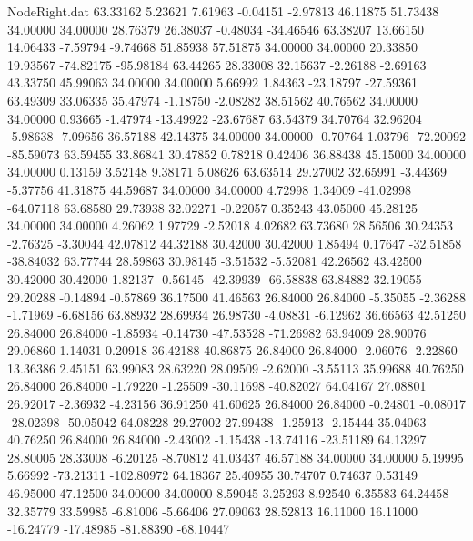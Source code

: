 \begin{filecontents}{NodeRight.dat}
  63.33162    5.23621    7.61963    -0.04151   -2.97813   46.11875   51.73438   34.00000   34.00000   28.76379   26.38037   -0.48034  -34.46546
  63.38207   13.66150   14.06433    -7.59794   -9.74668   51.85938   57.51875   34.00000   34.00000   20.33850   19.93567  -74.82175  -95.98184
  63.44265   28.33008   32.15637    -2.26188   -2.69163   43.33750   45.99063   34.00000   34.00000    5.66992    1.84363  -23.18797  -27.59361
  63.49309   33.06335   35.47974    -1.18750   -2.08282   38.51562   40.76562   34.00000   34.00000    0.93665   -1.47974  -13.49922  -23.67687
  63.54379   34.70764   32.96204    -5.98638   -7.09656   36.57188   42.14375   34.00000   34.00000   -0.70764    1.03796  -72.20092  -85.59073
  63.59455   33.86841   30.47852     0.78218    0.42406   36.88438   45.15000   34.00000   34.00000    0.13159    3.52148    9.38171    5.08626
  63.63514   29.27002   32.65991    -3.44369   -5.37756   41.31875   44.59687   34.00000   34.00000    4.72998    1.34009  -41.02998  -64.07118
  63.68580   29.73938   32.02271    -0.22057    0.35243   43.05000   45.28125   34.00000   34.00000    4.26062    1.97729   -2.52018    4.02682
  63.73680   28.56506   30.24353    -2.76325   -3.30044   42.07812   44.32188   30.42000   30.42000    1.85494    0.17647  -32.51858  -38.84032
  63.77744   28.59863   30.98145    -3.51532   -5.52081   42.26562   43.42500   30.42000   30.42000    1.82137   -0.56145  -42.39939  -66.58838
  63.84882   32.19055   29.20288    -0.14894   -0.57869   36.17500   41.46563   26.84000   26.84000   -5.35055   -2.36288   -1.71969   -6.68156
  63.88932   28.69934   26.98730    -4.08831   -6.12962   36.66563   42.51250   26.84000   26.84000   -1.85934   -0.14730  -47.53528  -71.26982
  63.94009   28.90076   29.06860     1.14031    0.20918   36.42188   40.86875   26.84000   26.84000   -2.06076   -2.22860   13.36386    2.45151
  63.99083   28.63220   28.09509    -2.62000   -3.55113   35.99688   40.76250   26.84000   26.84000   -1.79220   -1.25509  -30.11698  -40.82027
  64.04167   27.08801   26.92017    -2.36932   -4.23156   36.91250   41.60625   26.84000   26.84000   -0.24801   -0.08017  -28.02398  -50.05042
  64.08228   29.27002   27.99438    -1.25913   -2.15444   35.04063   40.76250   26.84000   26.84000   -2.43002   -1.15438  -13.74116  -23.51189
  64.13297   28.80005   28.33008    -6.20125   -8.70812   41.03437   46.57188   34.00000   34.00000    5.19995    5.66992  -73.21311 -102.80972
  64.18367   25.40955   30.74707     0.74637    0.53149   46.95000   47.12500   34.00000   34.00000    8.59045    3.25293    8.92540    6.35583
  64.24458   32.35779   33.59985    -6.81006   -5.66406   27.09063   28.52813   16.11000   16.11000  -16.24779  -17.48985  -81.88390  -68.10447

\end{filecontents}
